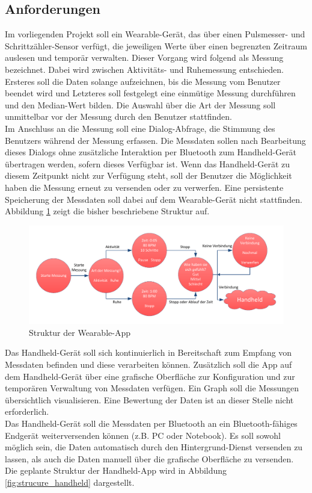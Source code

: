 \subsection{Anforderungen}
Im vorliegenden Projekt soll ein Wearable-Gerät, das über einen Pulsmesser- und Schrittzähler-Sensor verfügt, die jeweiligen Werte über einen begrenzten Zeitraum auslesen und temporär verwalten. Dieser Vorgang wird folgend als Messung bezeichnet. Dabei wird zwischen Aktivitäts- und Ruhemessung entschieden. Ersteres soll die Daten solange aufzeichnen, bis die Messung vom Benutzer beendet wird und Letzteres soll festgelegt eine einmütige Messung durchführen und den Median-Wert bilden. Die Auswahl über die Art der Messung soll unmittelbar vor der Messung durch den Benutzer stattfinden.
\\[0.5cm]
Im Anschluss an die Messung soll eine Dialog-Abfrage, die Stimmung des Benutzers während der Messung erfassen. Die Messdaten sollen nach Bearbeitung dieses Dialogs ohne zusätzliche Interaktion per Bluetooth zum Handheld-Gerät übertragen werden, sofern dieses Verfügbar ist. Wenn das Handheld-Gerät zu diesem Zeitpunkt nicht zur Verfügung steht, soll der Benutzer die Möglichkeit haben die Messung erneut zu versenden oder zu verwerfen. Eine persistente Speicherung der Messdaten soll dabei auf dem Wearable-Gerät nicht stattfinden. Abbildung \ref{fig:structure_wearable} zeigt die bisher beschriebene Struktur auf.

\bigskip
\begin{figure}[H]
	\centering
	\includegraphics[scale=0.65]{images/structure_wearable.pdf}
	\caption{Struktur der Wearable-App}
	\label{fig:structure_wearable}
\end{figure}
\bigskip

Das Handheld-Gerät soll sich kontinuierlich in Bereitschaft zum Empfang von Messdaten befinden und diese verarbeiten können. Zusätzlich soll die App auf dem Handheld-Gerät über eine grafische Oberfläche zur Konfiguration und zur temporären Verwaltung von Messdaten verfügen. Ein Graph soll die Messungen übersichtlich visualisieren. Eine Bewertung der Daten ist an dieser Stelle nicht erforderlich.
\\[0.5cm] 
Das Handheld-Gerät soll die Messdaten per Bluetooth an ein Bluetooth-fähiges Endgerät weiterversenden können (z.B. PC oder Notebook). Es soll sowohl möglich sein, die Daten automatisch durch den Hintergrund-Dienst versenden zu lassen, als auch die Daten manuell über die grafische Oberfläche zu versenden. Die geplante Struktur der Handheld-App wird in Abbildung \ref{fig:strucure_handheld} dargestellt.

